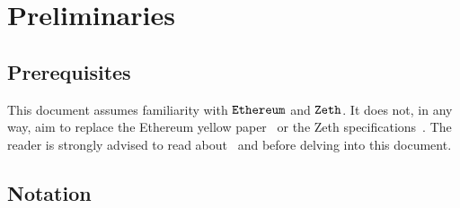 
\chapter{Preliminaries}\label{chap:preliminaries}

\section{Prerequisites}\label{preliminaries:prerequisites}

This document assumes familiarity with $\texttt{Ethereum}$ and $\texttt{Zeth}$.
It does not, in any way, aim to replace the Ethereum yellow paper~\cite{ethyellowpaper} or the Zeth specifications~\cite{zeth-protocol}. The reader is strongly advised to read about \ethereum~and \zeth{} before delving into this document.

\section{Notation}\label{preliminaries:notations}

